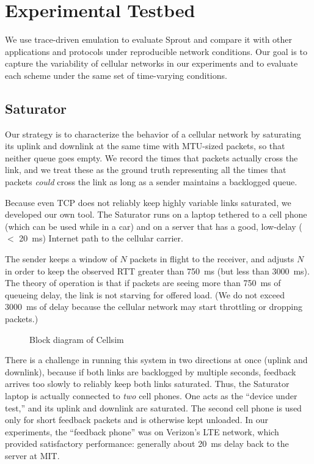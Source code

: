 \section{Experimental Testbed}
\label{s:impl}
\label{ss:platform}
We use trace-driven emulation to evaluate Sprout and compare it with
other applications and protocols under reproducible network
conditions. Our goal is to capture the variability of cellular
networks in our experiments and to evaluate each scheme under the same
set of time-varying conditions.

\subsection{Saturator} Our strategy is to characterize the behavior
of a cellular network by saturating its uplink and downlink at the
same time with MTU-sized packets, so that neither queue goes empty. We
record the times that packets actually cross the link, and we treat
these as the ground truth representing all the times that packets
\emph{could} cross the link as long as a sender maintains a backlogged
queue.

Because even TCP does not reliably keep highly variable links
saturated, we developed our own tool. The Saturator runs on a laptop
tethered to a cell phone (which can be used while in a car) and on a
server that has a good, low-delay ($<$ 20~ms) Internet path to the
cellular carrier.

The sender keeps a window of $N$ packets in flight to the receiver,
and adjusts $N$ in order to keep the observed RTT greater than 750~ms
(but less than 3000~ms). The theory of operation is that if packets
are seeing more than 750~ms of queueing delay, the link is not
starving for offered load. (We do not exceed 3000~ms of delay because
the cellular network may start throttling or dropping packets.)

\begin{figure}
  \caption{Block diagram of Cellsim}
\hspace{\baselineskip}

\noindent \def\svgwidth{\columnwidth}

\label{f:cellsim}

\end{figure}

There is a challenge in running this system in two directions at once
(uplink and downlink), because if both links are backlogged by
multiple seconds, feedback arrives too slowly to reliably keep both
links saturated. Thus, the Saturator laptop is actually connected to
\emph{two} cell phones. One acts as the ``device under test,'' and its
uplink and downlink are saturated.  The second cell phone is used only
for short feedback packets and is otherwise kept unloaded. In our
experiments, the ``feedback phone'' was on Verizon's LTE network,
which provided satisfactory performance: generally about 20~ms delay
back to the server at MIT.

